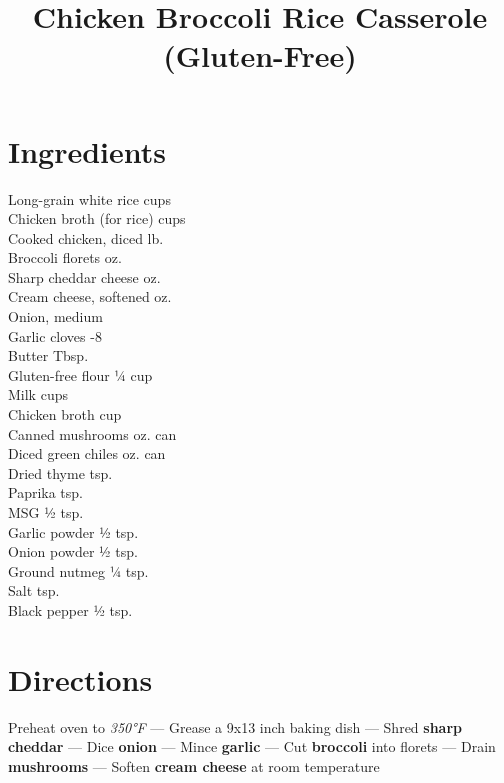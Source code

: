 \documentclass[11pt,letterpaper]{article}
\title{Chicken Broccoli Rice Casserole (Gluten-Free)}
\author{}
\date{}
\begin{document}
\maketitle
\thispagestyle{empty}

\section*{Ingredients}
\setlength{\columnsep}{20pt}
\begin{multicols}{2}
\noindent
    Long-grain white rice  cups \\
    Chicken broth (for rice)  cups \\
    Cooked chicken, diced  lb. \\
    Broccoli florets  oz. \\
    Sharp cheddar cheese  oz. \\
    Cream cheese, softened  oz. \\
    Onion, medium  \\
    Garlic cloves -8 \\
    Butter  Tbsp. \\
    Gluten-free flour \dotfill ¼ cup \\
    Milk  cups \\
    \columnbreak
    Chicken broth  cup \\
    Canned mushrooms  oz. can \\
    Diced green chiles  oz. can \\
    Dried thyme  tsp. \\
    Paprika  tsp. \\
    MSG \dotfill ½ tsp. \\
    Garlic powder \dotfill ½ tsp. \\
    Onion powder \dotfill ½ tsp. \\
    Ground nutmeg \dotfill ¼ tsp. \\
    Salt  tsp. \\
    Black pepper \dotfill ½ tsp. \\
\end{multicols}

\section*{Directions}

\noindent
Preheat oven to \textit{350°F} ---
Grease a 9x13 inch baking dish ---
Shred \textbf{sharp cheddar} ---
Dice \textbf{onion} ---
Mince \textbf{garlic} ---
Cut \textbf{broccoli} into florets ---
Drain \textbf{mushrooms} ---
Soften \textbf{cream cheese} at room temperature
\end{document}
